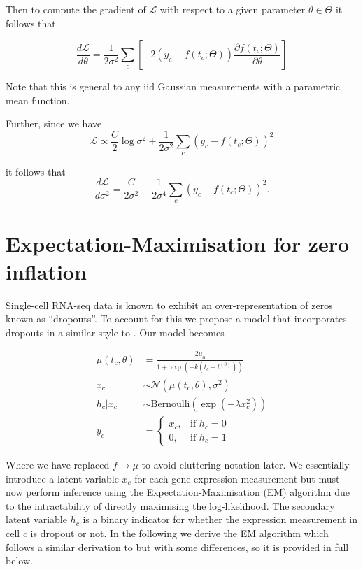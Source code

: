 Then to compute the gradient of $\mathcal{L}$ with respect to a given parameter $\theta \in \Theta$ it follows that


\begin{equation}
\frac{d\mathcal{L}}{d \theta} = \frac{1}{2 \sigma^2} \sum_c
\left[ -2 \left( y_c - f(t_c; \Theta) \right) \frac{\partial f(t_c; \Theta)}{\partial \theta} \right]
\end{equation}


Note that this is general to any iid Gaussian measurements with a parametric mean function.

Further, since we have
\begin{equation}
\mathcal{L} \propto \frac{C}{2} \log \sigma^2 + \frac{1}{2 \sigma^2}
\sum_c \left( y_c - f(t_c; \Theta) \right)^2
\end{equation}

it follows that
\begin{equation}
\frac{d\mathcal{L}}{d \sigma^2} = \frac{C}{2 \sigma^2} - \frac{1}{2 \sigma^4} \sum_c \left( y_c - f(t_c; \Theta) \right)^2.
\end{equation}

\section{Expectation-Maximisation for zero inflation} \label{app:switchdeem}

Single-cell RNA-seq data is known to exhibit an over-representation of zeros known as ``dropouts''. To account for this we propose a model that incorporates dropouts in a similar style to \cite{pierson2015zifa}. Our model becomes

\begin{equation}
\begin{aligned}
\mu(t_c, \theta) & = \frac{2 \mu_0}{1 + \exp\left(-k(t_c - t^{(0)})\right)} \\
x_{c} & \sim \mathcal{N}(\mu(t_c, \theta), \sigma^2) \\
h_{c} | x_{c} & \sim \mathrm{Bernoulli}(\exp(-\lambda x_{c}^2)) \\
    y_{c} &=
\begin{cases}
    x_{c} ,& \text{if } h_{c} = 0\\
    0,  & \text{if } h_{c} = 1
\end{cases}
\end{aligned}
\end{equation}

Where we have replaced $f \rightarrow \mu$ to avoid cluttering notation later. We essentially introduce a latent variable $x_c$ for each gene expression measurement but must now perform inference using the Expectation-Maximisation (EM) algorithm due to the intractability of directly maximising the log-likelihood. The secondary latent variable $h_c$ is a binary indicator for whether the expression measurement in cell $c$ is dropout or not. In the following we derive the EM algorithm which follows a similar derivation to \cite{pierson2015zifa} but with some differences, so it is provided in full below.

